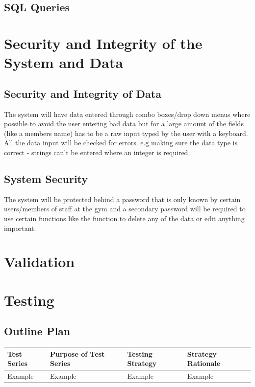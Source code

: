 \begin{itemize}
\subsection{SQL Queries}

\section{Security and Integrity of the System and Data}

\subsection{Security and Integrity of Data}
The system will have data entered through combo boxes/drop down menus where possible to avoid the user entering bad data but for a large amount of the fields (like a members name) has to be a raw input typed by the user with a keyboard. All the data input will be checked for errors. e.g making sure the data type is correct - strings can't be entered where an integer is required. 

\subsection{System Security}
The system will be protected behind a password that is only known by certain users/members of staff at the gym and a secondary password will be required to use certain functions like the function to delete any of the data or edit anything important.

\section{Validation}

\section{Testing}

\begin{landscape}
\subsection{Outline Plan}

\begin{center}
    \begin{tabular}{|p{2cm}|p{5cm}|p{5cm}|p{4cm}|}
        \hline
        \textbf{Test Series} & \textbf{Purpose of Test Series} & \textbf{Testing Strategy} & \textbf{Strategy Rationale}\\ \hline
        Example & Example & Example & Example \\ \hline
    \end{tabular}
\end{center}


\end{landscape}
\end{itemize}
